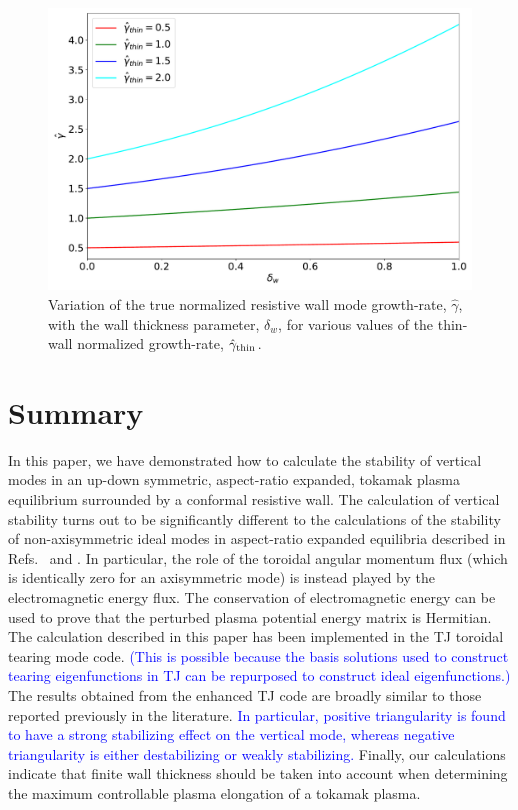 \documentclass[12pt,prb,aps]{revtex4-1}
\begin{document}
\begin{figure}
\centerline{\includegraphics[width=\textwidth]{Fig8.pdf}}
\caption{Variation of the true  normalized resistive wall  mode growth-rate, $\hat{\gamma}$,  with the wall thickness parameter, $\delta_w$, for various values of the thin-wall normalized growth-rate, $\hat{\gamma}_{\rm thin}$.  \label{fig10}}
\end{figure}

\section{Summary}\label{summary}
In this paper,  we have demonstrated how to calculate the stability of vertical modes in an up-down symmetric, aspect-ratio expanded, tokamak plasma equilibrium surrounded by
a conformal resistive wall. The calculation of vertical stability turns out to be significantly different to the calculations of the stability
of non-axisymmetric ideal modes in aspect-ratio expanded equilibria described in Refs.~ and . In particular, the role of the toroidal angular momentum flux (which is
identically zero for an axisymmetric mode) is instead played by the electromagnetic energy flux. The conservation of electromagnetic energy can be
used to prove that the perturbed plasma potential energy matrix is Hermitian. 
The calculation described in this paper has been implemented in the TJ toroidal tearing mode code. \textcolor{blue}{(This is possible because the basis solutions used to construct
tearing eigenfunctions in TJ can  be repurposed to construct ideal eigenfunctions.) }
The results obtained from the enhanced TJ code are broadly similar to those reported previously in the literature.\cite{f2,hump,reb,ros,ward,guz} 
\textcolor{blue}{In particular, positive triangularity is
found to have a strong stabilizing effect on the vertical mode, whereas negative triangularity is either destabilizing or weakly stabilizing.}  Finally, our calculations indicate that finite wall thickness should be taken into account when
determining the maximum controllable plasma elongation of a tokamak plasma. 
\end{document}
